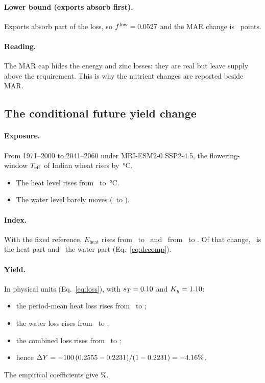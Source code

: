 \paragraph{Lower bound (exports absorb first).} Exports absorb part of the loss, so $f^{\text{low}} = 0.0527$ and
the MAR change is \wsDMARlower\ points.

\paragraph{Reading.} The MAR cap hides the energy and zinc losses: they are real but leave supply above the
requirement. This is why the nutrient changes are reported beside MAR.

\subsection{The conditional future yield change}
\paragraph{Exposure.} From 1971--2000 to 2041--2060 under MRI-ESM2-0 SSP2-4.5, the flowering-window $T_{\mathrm{eff}}$ of
Indian wheat rises by \wfdTeff\,\si{\celsius}.
\begin{itemize}
\item The heat level rises from \wfHheatHist\ to \wfHheatFut\,\si{\celsius}.
\item The water level barely moves (\wfHwaterHist\ to \wfHwaterFut).
\end{itemize}

\paragraph{Index.} With the fixed reference, $E_{\text{heat}}$ rises from \wfEheatHist\ to \wfEheatFut\ and
\Fd\ from \wfFFourHist\ to \wfFFourFut. Of that change, \wfdFfourHeat\ is the heat part and \wfdFfourWater\ the water
part (Eq.~\ref{eq:decomp}).

\paragraph{Yield.} In physical units (Eq.~\ref{eq:loss}), with $s_T=0.10$ and $K_y=1.10$:
\begin{itemize}
\item the period-mean heat loss rises from \wfHeatLossHist\ to \wfHeatLossFut;
\item the water loss rises from \wfWaterLossHist\ to \wfWaterLossFut;
\item the combined loss rises from \wfLossHist\ to \wfLossFut;
\item hence $\Delta Y = -100\,(0.2555-0.2231)/(1-0.2231) = -4.16\%$.
\end{itemize}
The empirical coefficients give \wfdYemp\%.

